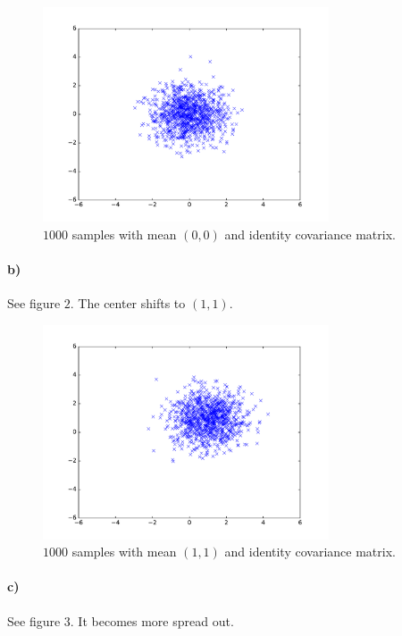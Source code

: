 \documentclass[12pt]{article}
\begin{document}
\begin{figure}[H]
        \begin{center}
                \includegraphics[height=2.5in]{Problem10-a}
                \caption{\(1000\) samples with mean \((0,0)\) and identity covariance matrix.}
        \end{center}
\end{figure}

\pagebreak

\paragraph{b)} See figure \(2\). The center shifts to \((1,1)\).

\begin{figure}[H]
        \begin{center}
                \includegraphics[height=2.5in]{Problem10-b}
                \caption{\(1000\) samples with mean \((1,1)\) and identity covariance matrix.}
        \end{center}
\end{figure}

\paragraph{c)} See figure \(3\). It becomes more spread out.
\end{document}
